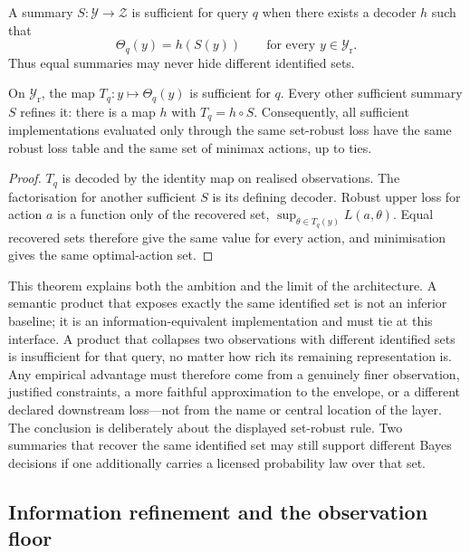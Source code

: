 \begin{definition}
A summary $S:\mathcal Y\to\mathcal Z$ is sufficient for query $q$ when there
exists a decoder $h$ such that
\begin{equation}
  \Theta_q(y)=h(S(y))\qquad\text{for every }y\in\mathcal Y_{\mathrm r}.
\end{equation}
Thus equal summaries may never hide different identified sets.
\end{definition}

\begin{theorem}
\label{thm:factorisation}
On $\mathcal Y_{\mathrm r}$, the map $T_q:y\mapsto\Theta_q(y)$ is sufficient
for $q$. Every other sufficient summary $S$ refines it: there is a map $h$
with $T_q=h\circ S$. Consequently, all sufficient implementations evaluated
only through the same set-robust loss have the same robust loss table and the
same set of minimax actions, up to ties.
\end{theorem}

\begin{proof}
$T_q$ is decoded by the identity map on realised observations. The
factorisation for another sufficient $S$ is its defining decoder. Robust upper
loss for action $a$ is a function only of the recovered set,
$\sup_{\theta\in T_q(y)}L(a,\theta)$. Equal recovered sets therefore give the
same value for every action, and minimisation gives the same optimal-action
set.
\end{proof}

This theorem explains both the ambition and the limit of the architecture. A
semantic product that exposes exactly the same identified set is not an
inferior baseline; it is an information-equivalent implementation and must
tie at this interface. A product that collapses two observations with
different identified sets is insufficient for that query, no matter how rich
its remaining representation is. Any empirical advantage must therefore come
from a genuinely finer observation, justified constraints, a more faithful
approximation to the envelope, or a different declared downstream loss---not
from the name or central location of the layer.
The conclusion is deliberately about the displayed set-robust rule. Two
summaries that recover the same identified set may still support different
Bayes decisions if one additionally carries a licensed probability law over
that set.

\subsection{Information refinement and the observation floor}

